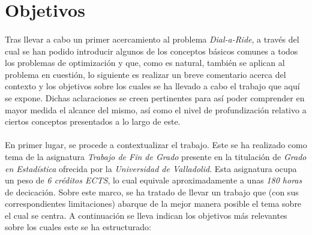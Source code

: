 \documentclass{subfiles}
\begin{document}
    \section{Objetivos}
    \label{sec:introduction_objectives}

      \paragraph{}
      Tras llevar a cabo un primer acercamiento al problema \emph{Dial-a-Ride}, a través del cual se han podido introducir algunos de los conceptos básicos comunes a todos los problemas de optimización y que, como es natural, también se aplican al problema en cuestión, lo siguiente es realizar un breve comentario acerca del contexto y los objetivos sobre los cuales se ha llevado a cabo el trabajo que aquí se expone. Dichas aclaraciones se creen pertinentes para así poder comprender en mayor medida el alcance del mismo, así como el nivel de profundización relativo a ciertos conceptos presentados a lo largo de este.

      \paragraph{}
      En primer lugar, se procede a contextualizar el trabajo. Este se ha realizado como tema de la asignatura \emph{Trabajo de Fin de Grado} presente en la titulación de \emph{Grado en Estadística} ofrecida por la \emph{Universidad de Valladolid}. Esta asignatura ocupa un peso de \emph{6 créditos ECTS}, lo cual equivale aproximadamente a unas \emph{180 horas} de decicación. Sobre este marco, se ha tratado de llevar un trabajo que (con sus correspondientes limitaciones) abarque de la mejor manera posible el tema sobre el cual se centra. A continuación se lleva indican los objetivos más relevantes sobre los cuales este se ha estructurado:
\end{document}
